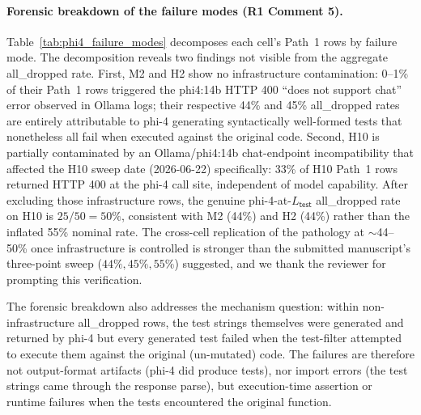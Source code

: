 \paragraph{Forensic breakdown of the failure modes (R1 Comment 5).}
Table~\ref{tab:phi4_failure_modes} decomposes each cell's Path~1 rows by failure mode. The decomposition reveals two findings not visible from the aggregate \textsf{all\_dropped} rate. First, M2 and H2 show no infrastructure contamination: 0--1\% of their Path~1 rows triggered the phi4:14b HTTP 400 ``does not support chat'' error observed in Ollama logs; their respective 44\% and 45\% \textsf{all\_dropped} rates are entirely attributable to phi-4 generating syntactically well-formed tests that nonetheless all fail when executed against the original code. Second, H10 is partially contaminated by an Ollama/phi4:14b chat-endpoint incompatibility that affected the H10 sweep date (2026-06-22) specifically: 33\% of H10 Path~1 rows returned HTTP 400 at the phi-4 call site, independent of model capability. After excluding those infrastructure rows, the genuine phi-4-at-$L_{\textsf{test}}$ \textsf{all\_dropped} rate on H10 is $25/50 = 50\%$, consistent with M2 (44\%) and H2 (44\%) rather than the inflated 55\% nominal rate. The cross-cell replication of the pathology at $\sim$44--50\% once infrastructure is controlled is stronger than the submitted manuscript's three-point sweep ($44\%, 45\%, 55\%$) suggested, and we thank the reviewer for prompting this verification.



The forensic breakdown also addresses the mechanism question: within non-infrastructure \textsf{all\_dropped} rows, the test strings themselves were generated and returned by phi-4 but every generated test failed when the test-filter attempted to execute them against the original (un-mutated) code. The failures are therefore not output-format artifacts (phi-4 did produce tests), nor import errors (the test strings came through the response parse), but execution-time assertion or runtime failures when the tests encountered the original function.

